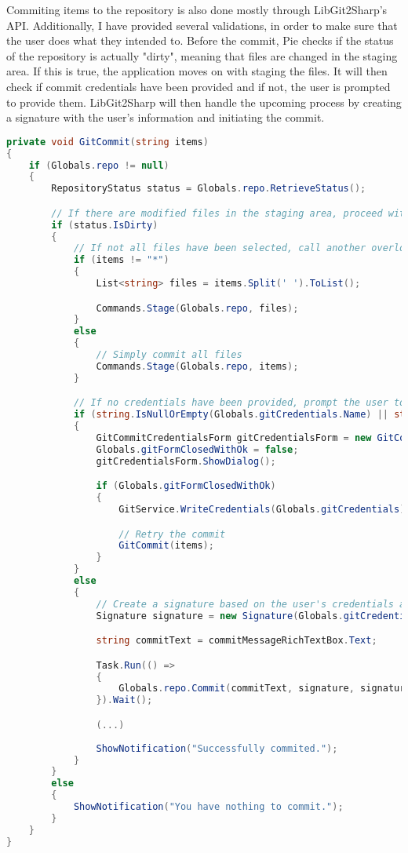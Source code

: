 Commiting items to the repository is also done mostly through LibGit2Sharp's API. Additionally, I have provided several validations, in order to make sure that the user does what they intended to. Before the commit, Pie checks if the status of the repository is actually "dirty", meaning that files are changed in the staging area. If this is true, the application moves on with staging the files. It will then check if commit credentials have been provided and if not, the user is prompted to provide them. LibGit2Sharp will then handle the upcoming process by creating a signature with the user's information and initiating the commit.

\begin{lstlisting}[language=csharp, caption={Commiting to a repository using LibGit2Sharp}]
private void GitCommit(string items)
{
    if (Globals.repo != null)
    {
        RepositoryStatus status = Globals.repo.RetrieveStatus();

        // If there are modified files in the staging area, proceed with the commit
        if (status.IsDirty)
        {
            // If not all files have been selected, call another overloaded version of Stage()
            if (items != "*")
            {
                List<string> files = items.Split(' ').ToList();

                Commands.Stage(Globals.repo, files);
            }
            else
            {
                // Simply commit all files
                Commands.Stage(Globals.repo, items);
            }

            // If no credentials have been provided, prompt the user to type in their name and email address
            if (string.IsNullOrEmpty(Globals.gitCredentials.Name) || string.IsNullOrEmpty(Globals.gitCredentials.Email))
            {
                GitCommitCredentialsForm gitCredentialsForm = new GitCommitCredentialsForm();
                Globals.gitFormClosedWithOk = false;
                gitCredentialsForm.ShowDialog();

                if (Globals.gitFormClosedWithOk)
                {
                    GitService.WriteCredentials(Globals.gitCredentials);

                    // Retry the commit
                    GitCommit(items);
                }
            }
            else
            {
                // Create a signature based on the user's credentials and run the commit
                Signature signature = new Signature(Globals.gitCredentials.Name, Globals.gitCredentials.Email, DateTime.Now);

                string commitText = commitMessageRichTextBox.Text;

                Task.Run(() =>
                {
                    Globals.repo.Commit(commitText, signature, signature);
                }).Wait();

                (...)
                
                ShowNotification("Successfully commited.");
            }
        }
        else
        {
            ShowNotification("You have nothing to commit.");
        }
    }
}
\end{lstlisting}

